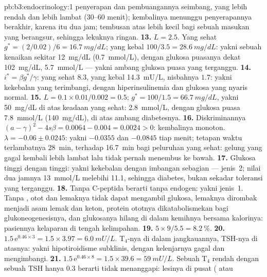 \begin{solution}{pb:b3:endocrinology:1}
penyerapan dan pembuangannya seimbang, yang lebih rendah dan lebih lambat (30--60 menit);
kembalinya menunggu penyerapannya berakhir, karena itu dua jam; tembusan atas
 lebih kecil bagi sebuah masukan yang berangsur, sehingga lekuknya ringan.
\textbf{13.} $L = 2.5$. Yang sehat $g^{*} = (2/0.02)/6 = \qty{16.7}{mg/dL}$;
yang kebal $100/3.5 = \qty{28.6}{mg/dL}$: yakni sebuah kenaikan sekitar
\qty{12}{mg/dL} (\qty{0.7}{mmol/L}), dengan glukosa puasanya dekat
\qty{102}{mg/dL}, \qty{5.7}{mmol/L} --- yakni ambang glukosa puasa yang
terganggu.
\textbf{14.} $i^{*} = \beta g^{*}/\gamma$: yang sehat $8.3$, yang kebal
\qty{14.3}{mU/L}, nisbahnya $1.7$: yakni kekebalan  yang terimbangi,
dengan hiperinsulinemia dan glukosa yang nyaris normal.
\textbf{15.} $L = 0.1\times 0.01/0.002 = 0.5$; $g^{*} = 100/1.5 =
\qty{66.7}{mg/dL}$, yakni \qty{50}{mg/dL} di atas keadaan yang sehat:
\qty{2.8}{mmol/L}, dengan glukosa puasa \qty{7.8}{mmol/L} (\qty{140}{mg/dL}),
di atas ambang diabetesnya.
\textbf{16.} Diskriminannya $(a - \gamma)^{2} - 4s\beta = 0.0064 - 0.004 =
0.0024 > 0$: kembalinya monoton. $\lambda = -0.06 \pm 0.0245$: yakni $-0.0355$
dan $-0.0845$ tiap menit; tetapan waktu terlambatnya \qty{28}{min}, terhadap
\qty{16.7}{min} bagi peluruhan yang sehat: gelung yang gagal kembali lebih
lambat lalu tidak pernah menembus ke bawah.
\textbf{17.} Glukosa tinggi dengan  tinggi: yakni kekebalan dengan imbangan
sebagian --- jenis~2; nilai dua jamnya \qty{13}{mmol/L} melebihi
\qty{11.1}{}, sehingga diabetes, bukan sekadar toleransi yang terganggu.
\textbf{18.} Tanpa C-peptida berarti tanpa  endogen: yakni jenis~1. Tanpa
, otot dan lemaknya tidak dapat mengambil glukosa, lemaknya dirombak menjadi
asam lemak dan keton, protein ototnya dikatabolismekan bagi
glukoneogenesisnya, dan glukosanya hilang di dalam kemihnya bersama kalorinya:
pasiennya kelaparan di tengah kelimpahan.
\textbf{19.} $5\times 9/5.5 = \qty{8.2}{\%}$.
\textbf{20.} $1.5\,\mathrm{e}^{0.46\times 3} = 1.5\times 3.97 =
\qty{6.0}{mU/L}$. T$_{4}$-nya di dalam jangkauannya, TSH-nya di atasnya: yakni
hipotiroidisme subklinis, dengan kelenjarnya gagal dan  mengimbangi.
\textbf{21.} $1.5\,\mathrm{e}^{0.46\times 8} = 1.5\times 39.6 =
\qty{59}{mU/L}$. Sebuah T$_{4}$ rendah dengan sebuah TSH hanya $0.3$ berarti
 tidak menanggapi: lesinya di pusat ( atau

\end{solution}
